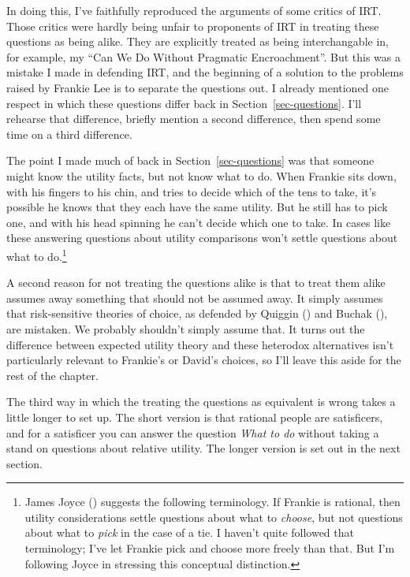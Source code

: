 \documentclass[
  10pt,
  letterpaper,
  twoside]{scrbook}
\begin{document}
In doing this, I've faithfully reproduced the arguments of some critics
of IRT. Those critics were hardly being unfair to proponents of IRT in
treating these questions as being alike. They are explicitly treated as
being interchangable in, for example, my ``Can We Do Without Pragmatic
Encroachment''. But this was a mistake I made in defending IRT, and the
beginning of a solution to the problems raised by Frankie Lee is to
separate the questions out. I already mentioned one respect in which
these questions differ back in Section~\ref{sec-questions}. I'll
rehearse that difference, briefly mention a second difference, then
spend some time on a third difference.

The point I made much of back in Section~\ref{sec-questions} was that
someone might know the utility facts, but not know what to do. When
Frankie sits down, with his fingers to his chin, and tries to decide
which of the tens to take, it's possible he knows that they each have
the same utility. But he still has to pick one, and with his head
spinning he can't decide which one to take. In cases like these
answering questions about utility comparisons won't settle questions
about what to do.\footnote{James Joyce ()
  suggests the following terminology. If Frankie is rational, then
  utility considerations settle questions about what to \emph{choose},
  but not questions about what to \emph{pick} in the case of a tie. I
  haven't quite followed that terminology; I've let Frankie pick and
  choose more freely than that. But I'm following Joyce in stressing
  this conceptual distinction.}

A second reason for not treating the questions alike is that to treat
them alike assumes away something that should not be assumed away. It
simply assumes that risk-sensitive theories of choice, as defended by
Quiggin () and Buchak
(), are mistaken. We probably shouldn't
simply assume that. It turns out the difference between expected utility
theory and these heterodox alternatives isn't particularly relevant to
Frankie's or David's choices, so I'll leave this aside for the rest of
the chapter.

The third way in which the treating the questions as equivalent is wrong
takes a little longer to set up. The short version is that rational
people are satisficers, and for a satisficer you can answer the question
\emph{What to do} without taking a stand on questions about relative
utility. The longer version is set out in the next section.
\end{document}

